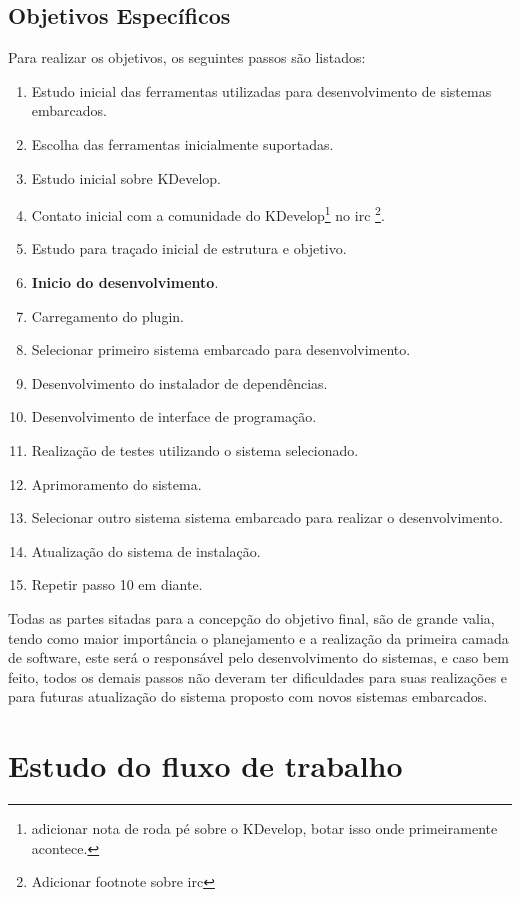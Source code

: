 \subsection{Objetivos Específicos}
\label{ss:objetivosespecificos}
Para realizar os objetivos, os seguintes passos são listados:
\begin{enumerate}
\item Estudo inicial das ferramentas utilizadas para desenvolvimento de sistemas embarcados.
\item Escolha das ferramentas inicialmente suportadas.
\item Estudo inicial sobre KDevelop.
\item Contato inicial com a comunidade do KDevelop\footnote{adicionar nota de roda pé sobre o KDevelop, botar isso onde primeiramente acontece.} no irc  \footnote{Adicionar footnote sobre irc}.
\item Estudo para traçado inicial de estrutura e objetivo.
\item \textbf{Inicio do desenvolvimento}.
\item Carregamento do plugin.
\item Selecionar primeiro sistema embarcado para desenvolvimento.
\item Desenvolvimento do instalador de dependências.
\item Desenvolvimento de interface de programação.
\item Realização de testes utilizando o sistema selecionado.
\item Aprimoramento do sistema.
\item Selecionar outro sistema sistema embarcado para realizar o desenvolvimento.
\item Atualização do sistema de instalação.
\item Repetir passo 10 em diante.
\end{enumerate}

Todas as partes sitadas para a concepção do objetivo final, são de grande valia, tendo como maior importância o planejamento e a realização da primeira camada de software, este será o responsável pelo desenvolvimento do sistemas, e caso bem feito, todos os demais passos não deveram ter dificuldades para suas realizações e para futuras atualização do sistema proposto com novos sistemas embarcados.

\section{Estudo do fluxo de trabalho}

